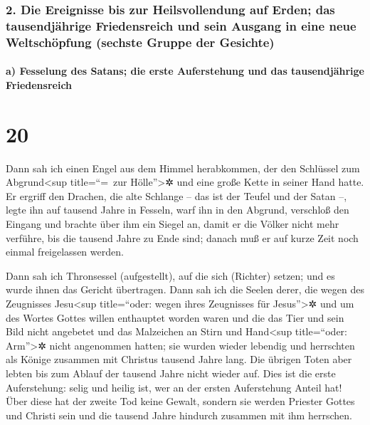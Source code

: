 \hypertarget{die-ereignisse-bis-zur-heilsvollendung-auf-erden-das-tausendjuxe4hrige-friedensreich-und-sein-ausgang-in-eine-neue-weltschuxf6pfung-sechste-gruppe-der-gesichte}{%
\subsubsection{2. Die Ereignisse bis zur Heilsvollendung auf Erden; das
tausendjährige Friedensreich und sein Ausgang in eine neue Weltschöpfung
(sechste Gruppe der
Gesichte)}\label{die-ereignisse-bis-zur-heilsvollendung-auf-erden-das-tausendjuxe4hrige-friedensreich-und-sein-ausgang-in-eine-neue-weltschuxf6pfung-sechste-gruppe-der-gesichte}}

\hypertarget{a-fesselung-des-satans-die-erste-auferstehung-und-das-tausendjuxe4hrige-friedensreich}{%
\paragraph{a) Fesselung des Satans; die erste Auferstehung und das
tausendjährige
Friedensreich}\label{a-fesselung-des-satans-die-erste-auferstehung-und-das-tausendjuxe4hrige-friedensreich}}

\hypertarget{section-19}{%
\section{20}\label{section-19}}

 Dann sah ich einen Engel aus dem Himmel herabkommen, der
den Schlüssel zum Abgrund\textless sup title=``=~zur
Hölle''\textgreater✲ und eine große Kette in seiner Hand hatte.
 Er ergriff den Drachen, die alte Schlange -- das ist der
Teufel und der Satan --, legte ihn auf tausend Jahre in Fesseln,
 warf ihn in den Abgrund, verschloß den Eingang und
brachte über ihm ein Siegel an, damit er die Völker nicht mehr verführe,
bis die tausend Jahre zu Ende sind; danach muß er auf kurze Zeit noch
einmal freigelassen werden.

 Dann sah ich Thronsessel (aufgestellt), auf die sich
(Richter) setzen; und es wurde ihnen das Gericht übertragen. Dann sah
ich die Seelen derer, die wegen des Zeugnisses Jesu\textless sup
title=``oder: wegen ihres Zeugnisses für Jesus''\textgreater✲ und um des
Wortes Gottes willen enthauptet worden waren und die das Tier und sein
Bild nicht angebetet und das Malzeichen an Stirn und Hand\textless sup
title=``oder: Arm''\textgreater✲ nicht angenommen hatten; sie wurden
wieder lebendig und herrschten als Könige zusammen mit Christus tausend
Jahre lang.  Die übrigen Toten aber lebten bis zum Ablauf
der tausend Jahre nicht wieder auf. Dies ist die erste Auferstehung:
 selig und heilig ist, wer an der ersten Auferstehung
Anteil hat! Über diese hat der zweite Tod keine Gewalt, sondern sie
werden Priester Gottes und Christi sein und die tausend Jahre hindurch
zusammen mit ihm herrschen.

